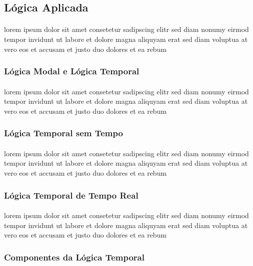 \subsection{Lógica Aplicada}
\paragraph{}
lorem ipsum dolor sit amet consetetur sadipscing elitr sed diam nonumy
eirmod tempor invidunt ut labore et dolore magna aliquyam erat sed diam
voluptua at vero eos et accusam et justo duo dolores et ea rebum

\subsubsection{Lógica Modal e Lógica Temporal}
\paragraph{}
lorem ipsum dolor sit amet consetetur sadipscing elitr sed diam nonumy
eirmod tempor invidunt ut labore et dolore magna aliquyam erat sed diam
voluptua at vero eos et accusam et justo duo dolores et ea rebum

\subsubsection{Lógica Temporal sem Tempo}
\paragraph{}
lorem ipsum dolor sit amet consetetur sadipscing elitr sed diam nonumy
eirmod tempor invidunt ut labore et dolore magna aliquyam erat sed diam
voluptua at vero eos et accusam et justo duo dolores et ea rebum

\subsubsection{Lógica Temporal de Tempo Real}
\paragraph{}
lorem ipsum dolor sit amet consetetur sadipscing elitr sed diam nonumy
eirmod tempor invidunt ut labore et dolore magna aliquyam erat sed diam
voluptua at vero eos et accusam et justo duo dolores et ea rebum

\subsubsection{Componentes da Lógica Temporal}
